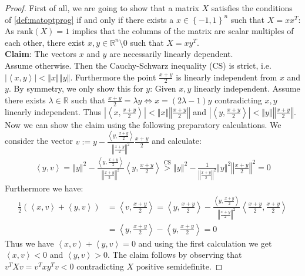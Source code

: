 \documentclass[12pt,a4paper]{article}
\theoremstyle{mythm}
\begin{document}
\begin{proof}
First of all, we are going to show that a matrix $ X $ satisfies the conditions of \ref{def:matoptprog} if and only if there exists a $ x \in \left\{ -1,1 \right\} ^{ n }  $
such that $ X = xx^T $: \\
As $ \text{rank} (X) = 1$ implies that the columns of the matrix are scalar multiples of each other, there exist $ x,y \in \mathbb{R} ^{ n } \setminus {0}  $ such that $ X =
xy^T $. \\
\textbf{Claim}: The vectors $x $ and $ y $ are necessarily linearly dependent. \\
Assume otherwise. Then the Cauchy-Schwarz inequality (CS) is strict, i.e. $ \left| \left\langle x , y \right\rangle \right| < \left\Vert x \right\Vert \left\Vert y
\right\Vert   $. Furthermore the point $ \frac{ x+y }{ 2 }  $ is linearly independent from $ x $ and $ y $. By symmetry, we only show this for $ y $: 
Given $ x,y $ linearly independent. Assume there exists $ \lambda \in \mathbb{R}  $ such that $ \frac{ x+y }{ 2 } = \lambda y \Leftrightarrow x = (2 \lambda -1) y$
contradicting $ x,y $ linearly independent. Thus $ \left| \left\langle x , \frac{ x+y }{ 2 }  \right\rangle  \right| < \left\Vert x \right\Vert \left\Vert \frac{ x+y }{ 2 }
\right\Vert  $   and
$ \left| \left\langle y ,  \frac{ x+y }{ 2 } \right\rangle  \right| < \left\Vert y \right\Vert \left\Vert \frac{ x+y }{ 2 } \right\Vert  $. 
Now we can show the claim using the following preparatory calculations.
We consider the vector $ v := y - \frac{ \left\langle y , \frac{ x+y }{ 2 } \right\rangle  }{ \left\Vert \frac{ x+y }{ 2 } \right\Vert ^{ 2 }  }  \frac{ x+y }{ 2 } $ and
calculate:
\begin{align*}
\left\langle y , v \right\rangle = \left\Vert y \right\Vert ^{ 2 } - \frac{ \left\langle y , \frac{ x+y }{ 2 } \right\rangle  }{ \left\Vert \frac{ x+y }{ 2 } \right\Vert ^{ 2
}  } \left\langle y , \frac{ x+y }{ 2 } \right\rangle \overset{ \text{CS}  }{ >} \left\Vert y \right\Vert ^{ 2 } - \frac{ 1 }{ \left\Vert \frac{ x+y }{ 2 } \right\Vert ^{ 2 }
} \left\Vert y \right\Vert ^{ 2 } \left\Vert \frac{ x+y }{ 2 } \right\Vert ^{ 2 } =0 
\end{align*} 
Furthermore we have:
\begin{align*}
\frac{ 1 }{ 2 } \left(  \left\langle x , v \right\rangle + \left\langle y , v  \right\rangle \right) &= 
\left\langle v  , \frac{ x+y }{ 2 }  \right\rangle = \left\langle y , \frac{ x+y }{ 2 }
\right\rangle - \frac{ \left\langle y , \frac{ x+y }{ 2 }  \right\rangle  }{ \left\Vert \frac{ x+y }{ 2 }  \right\Vert ^{ 2 }  } \left\langle \frac{ x+y }{ 2 } , \frac{ x+y }{
2 } \right\rangle \\
&= \left\langle y , \frac{ x+y }{ 2 } \right\rangle - \left\langle y , \frac{ x+y }{ 2 }  \right\rangle =0
\end{align*} 
Thus we have $ \left\langle x , v \right\rangle + \left\langle y , v  \right\rangle =0 $ and using the first calculation we get $ \left\langle x , v \right\rangle <0 $ and $
\left\langle y , v  \right\rangle   > 0$. 
The claim follows by observing that $ v ^T X v = v ^T x y ^T v < 0  $ contradicting $ X $ positive semidefinite.


\end{proof}
\end{document}
